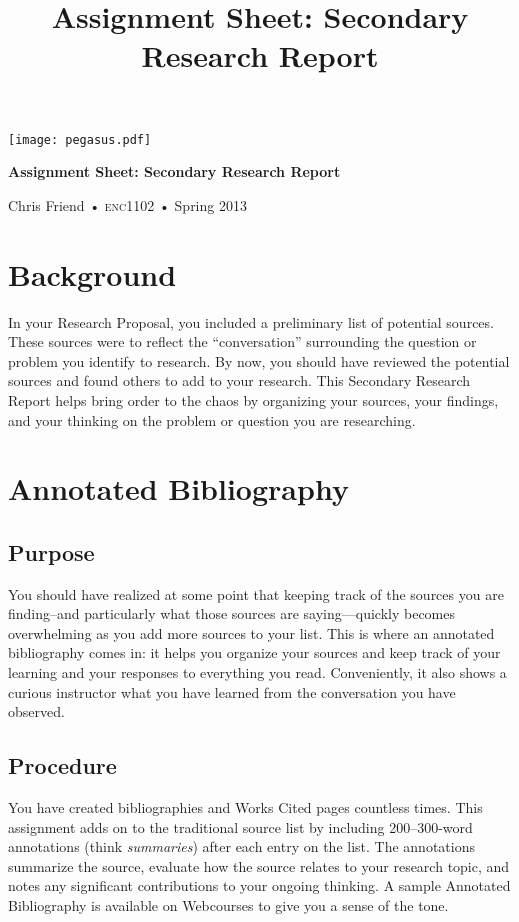 \documentclass[11pt, twosides]{amsart}	%
\title[Secondary Research Report]{Assignment Sheet: Secondary Research Report}
\begin{document}
%
\thispagestyle{empty}

\vspace{-2in}
\begin{center}
\huge
\texttt{[image: pegasus.pdf]}

\textbf{Assignment Sheet: Secondary Research Report}

{\normalsize Chris Friend • \textsc{enc1102} • Spring 2013}
\end{center}
\vspace{1.5\baselineskip}

\section{Background} %
\label{sec:background}
In your Research Proposal, you included a preliminary list of potential sources. These sources were to reflect the “conversation” surrounding the question or problem you identify to research.  By now, you should have reviewed the potential sources and found others to add to your research. This Secondary Research Report helps bring order to the chaos by organizing your sources, your findings, and your thinking on the problem or question you are researching.


\section{Annotated Bibliography} %
\label{sec:annotated_bibliography}

\subsection{Purpose} %
\label{sec:bib-purpose}
You should have realized at some point that keeping track of the sources you are finding–and particularly what those sources are saying—quickly becomes overwhelming as you add more sources to your list. This is where an annotated bibliography comes in: it helps you organize your sources and keep track of your learning and your responses to everything you read. Conveniently, it also shows a curious instructor what you have learned from the conversation you have observed.

\subsection{Procedure} %
\label{sec:bib-procedure}
You have created bibliographies and Works Cited pages countless times. This assignment adds on to the traditional source list by including 200–300-word annotations (think \emph{summaries}) after each entry on the list. The annotations summarize the source, evaluate how the source relates to your research topic, and notes any significant contributions to your ongoing thinking. A sample Annotated Bibliography is available on Webcourses to give you a sense of the tone.
\end{document}
